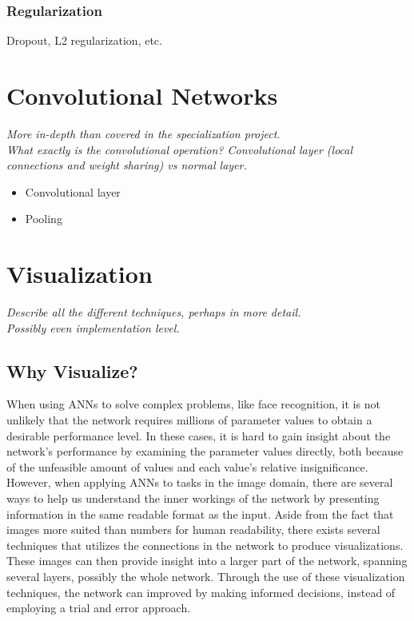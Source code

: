 \subsubsection{Regularization}

Dropout, L2 regularization, etc.

\section{Convolutional Networks}

\textit{More in-depth than covered in the specialization project. \\
What exactly is the convolutional operation? Convolutional layer (local connections and weight sharing) vs normal layer.}

\begin{itemize}
    \item Convolutional layer
    \item Pooling
\end{itemize}

\section{Visualization}
\textit{Describe all the different techniques, perhaps in more detail. \\
Possibly even implementation level.}

\subsection{Why Visualize?}

When using ANNs to solve complex problems, like face recognition, it is not unlikely that the network requires millions of parameter values to obtain a desirable performance level. In these cases, it is hard to gain insight about the network's performance by examining the parameter values directly, both because of the unfeasible amount of values and each value's relative insignificance. However, when applying ANNs to tasks in the image domain, there are several ways to help us understand the inner workings of the network by presenting information in the same readable format as the input. Aside from the fact that images more suited than numbers for human readability, there exists several techniques that utilizes the connections in the network to produce visualizations. These images can then provide insight into a larger part of the network, spanning several layers, possibly the whole network. Through the use of these visualization techniques, the network can improved by making informed decisions, instead of employing a trial and error approach.

